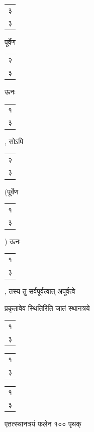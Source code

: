 \documentclass[10pt, openany]{book}
\begin{document}
{{{
{\begin{tabular}{r}३ \\३ \end{tabular}पूर्वेण\begin{tabular}{r}२\\ ३\end{tabular}ऊनः\begin{tabular}{r}१\\ ३\end{tabular}, सोऽपि\begin{tabular}{r}२\\ ३\end{tabular}\bigg(पूर्वेण \begin{tabular}{r}१\\ ३\end{tabular}\bigg) ऊनः\begin{tabular}{r}१\\ ३\end{tabular}, तस्य तु
सर्वपूर्वत्वात् अपूर्वत्वे}
{प्रकृतावेव स्थितिरिति जातं स्थानत्रये\begin{tabular}{r|}१\\ ३\end{tabular}\begin{tabular}{r|}१\\ ३\end{tabular}\begin{tabular}{r}१\\ ३\end{tabular}एतत्स्थानत्रयं
फलेन १०० पृथक्}
}}}
\end{document}
